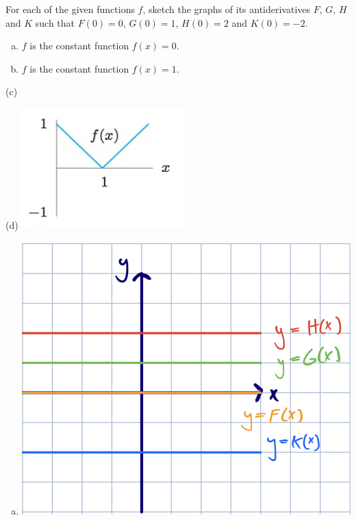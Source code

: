 \documentclass[11pt]{exam}
\begin{document}
\begin{questions}
  \question For each of the given functions $f$, sketch the graphs of its antiderivatives $F$, $G$, $H$ and $K$ such that $F(0)=0$, $G(0)=1$, $H(0)=2$ and $K(0)=-2$.
\begin{multicols}{2}
\begin{enumerate}[(a)]
\item $f$ is the constant function $f(x)=0$.	
\item $f$ is the constant function $f(x)=1$.	
\end{enumerate}
\end{multicols}
\begin{minipage}{0.5\linewidth}
  (c)
\end{minipage}
\begin{minipage}{0.5\linewidth}
  (d) \includegraphics[width=2.5in]{no7.jpg}
\end{minipage}
\begin{solution}
  \begin{multicols}{2}
    \begin{enumerate}[(a)]
    \item \includegraphics[scale=0.4]{1a}

\end{enumerate}
\end{multicols}
\end{solution}
\end{questions}
\end{document}
